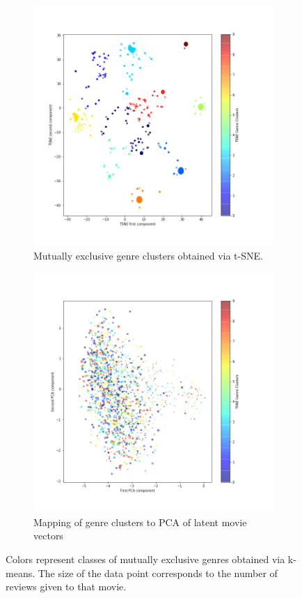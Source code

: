 \begin{figure}[H]
	\centering
	\begin{subfigure}[t]{0.4\textwidth}
		\includegraphics[width=\textwidth]{TSNEcluster.png}
		\caption{Mutually exclusive genre clusters obtained via t-SNE.}
	\end{subfigure}
	\begin{subfigure}[t]{0.4\textwidth}
		\includegraphics[width=\textwidth]{TSNE_PCA_cluster.png}
		\caption{Mapping of genre clusters to PCA of latent movie vectors}
	\end{subfigure}
	\caption{Colors represent classes of mutually exclusive genres obtained via k-means. The size of the data point corresponds to the number of reviews given to that movie.}
\end{figure}

